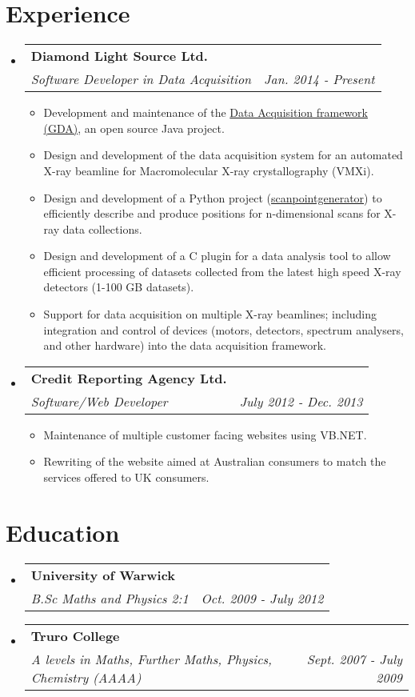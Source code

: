 \documentclass[11pt]{article}
\makeatletter
\newcommand{\cvheading}[3]{
    \begin{tabular*}{0.9\textwidth}[t]{l@{\extracolsep{\fill}}r}
        \textbf{#1}\\
        \textit{#2} & \textit{#3}\\
    \end{tabular*}\vspace{-5pt}
}
\newcommand{\cvitem}[1]{\item #1\vspace{-2pt}}
\makeatother
\begin{document}
\section{Experience}
\begin{itemize}
    \item
        \cvheading
            {Diamond Light Source Ltd.}
            {Software Developer in Data Acquisition}{Jan. 2014 - Present}
            \begin{itemize}
            \cvitem
                {Development and maintenance of the
                \href{https://github.com/openGDA}{Data Acquisition framework (GDA)}, an open source Java project.}
            \cvitem
                {Design and development of the data acquisition system for an automated X-ray beamline for
                Macromolecular X-ray crystallography (VMXi).}
            \cvitem
                {Design and development of a Python project
                (\href{https://github.com/dls-controls/scanpointgenerator}{scanpointgenerator})
                to efficiently describe and produce positions for n-dimensional scans for X-ray data collections.}
            \cvitem
                {Design and development of a C plugin for a data analysis tool to allow efficient processing of datasets
                collected from the latest high speed X-ray detectors (1-100 GB datasets).}
            \cvitem
                {Support for data acquisition on multiple X-ray beamlines; including integration and control of devices
                (motors, detectors, spectrum analysers, and other hardware) into the data acquisition framework.}
            \end{itemize}
    \item
        \cvheading
            {Credit Reporting Agency Ltd.}
            {Software/Web Developer}{July 2012 - Dec. 2013}
            \begin{itemize}
            \cvitem
                {Maintenance of multiple customer facing websites using VB.NET.}
            \cvitem
                {Rewriting of the website aimed at Australian consumers to match the services
                offered to UK consumers.}
            \end{itemize}

\end{itemize}

\section{Education}
\begin{itemize}
    \item
        \cvheading
            {University of Warwick}
            {B.Sc Maths and Physics 2:1}{Oct. 2009 - July 2012}
    \item
        \cvheading
            {Truro College}
            {A levels in Maths, Further Maths, Physics, Chemistry (AAAA)}{Sept. 2007 - July 2009}
\end{itemize}
\end{document}
